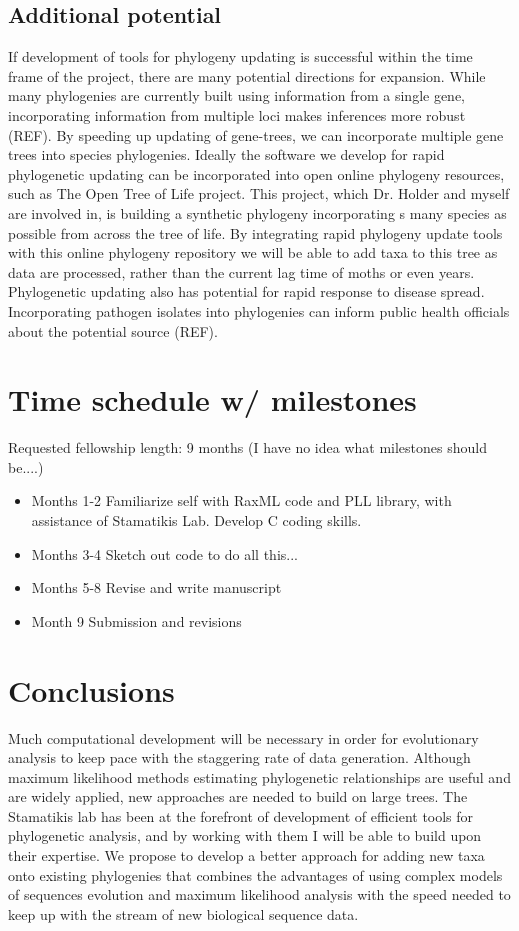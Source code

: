 \documentclass[10pt]{article}
\begin{document}
\subsection*{Additional potential}
If development of tools for phylogeny updating is successful within the time frame of the project, there are many potential directions for expansion. 
While many phylogenies are currently built using information from a single gene, incorporating information from multiple loci makes inferences more robust (REF). 
By speeding up updating of gene-trees, we can incorporate multiple gene trees into species phylogenies.
Ideally the software we develop for rapid phylogenetic updating can be incorporated into open online phylogeny resources, such as The Open Tree of Life project. 
This project, which Dr. 
Holder and myself are involved in, is building a synthetic phylogeny incorporating s many species as possible from across the tree of life. 
By integrating rapid phylogeny update tools with this online phylogeny repository we will be able to add taxa to this tree as data are processed, rather than the current lag time of moths or even years. 
Phylogenetic updating also has potential for rapid response to disease spread. 
Incorporating pathogen isolates into phylogenies can inform public health officials about the potential source (REF).

         
\section*{Time schedule w/ milestones}
   Requested fellowship length: 9 months
   (I have no idea what milestones should be....)
 
\begin{itemize}
  \item{Months 1-2} Familiarize self with RaxML code and PLL library, with assistance of Stamatikis Lab. 
Develop C coding skills.
  \item{Months 3-4} Sketch out code to do all this... 

  \item{Months 5-8} Revise and write manuscript
  \item{Month 9} Submission and revisions
\end{itemize}


\section*{Conclusions}
Much computational development will be necessary in order for evolutionary analysis to keep pace with the staggering rate of data generation. 
Although maximum likelihood methods estimating phylogenetic relationships are useful and are widely applied, new approaches are needed to build on large trees. 
The Stamatikis lab has been at the forefront of development of efficient tools for phylogenetic analysis, and by working with them I will be able to build upon their expertise. 
We propose to develop a better approach for adding new taxa onto existing phylogenies that combines the advantages of using complex models of sequences evolution and maximum likelihood analysis with the speed needed to keep up with the stream of new biological sequence data. 
\end{document}
